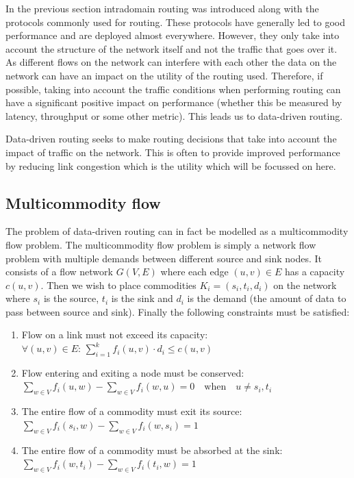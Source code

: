 In the previous section intradomain routing was introduced along with the protocols commonly used for routing. These protocols have generally led to good performance and are deployed almost everywhere. However, they only take into account the structure of the network itself and not the traffic that goes over it. As different flows on the network can interfere with each other the data on the network can have an impact on the utility of the routing used. Therefore, if possible, taking into account the traffic conditions when performing routing can have a significant positive impact on performance (whether this be measured by latency, throughput or some other metric). This leads us to data-driven routing.

Data-driven routing seeks to make routing decisions that take into account the impact of traffic on the network. This is often to provide improved performance by reducing link congestion which is the utility which will be focussed on here.

\subsection{Multicommodity flow}

The problem of data-driven routing can in fact be modelled as a multicommodity flow problem. The multicommodity flow problem is simply a network flow problem with multiple demands between different source and sink nodes. It consists of a flow network $G(V,E)$ where each edge $(u,v) \in E$ has a capacity $c(u,v)$. Then we wish to place commodities $K_i = (s_i, t_i, d_i)$ on the network where $s_i$ is the source, $t_i$ is the sink and $d_i$ is the demand (the amount of data to pass between source and sink). Finally the following constraints must be satisfied:

\begin{enumerate}
    \item Flow on a link must not exceed its capacity:\\
    $\forall (u,v)\in E:\,\sum_{i=1}^{k} f_i(u,v)\cdot d_i \leq c(u,v)$
    \item Flow entering and exiting a node must be conserved:\\
    $\sum_{w \in V} f_i(u,w) - \sum_{w \in V} f_i(w,u) = 0 \quad \mathrm{when} \quad u \neq s_i, t_i$
    \item The entire flow of a commodity must exit its source:\\
    $\sum_{w \in V} f_i(s_i,w) - \sum_{w \in V} f_i(w,s_i) = 1$
    \item The entire flow of a commodity must be absorbed at the sink:\\
    $\sum_{w \in V} f_i(w,t_i) - \sum_{w \in V} f_i(t_i,w) = 1$
\end{enumerate}

